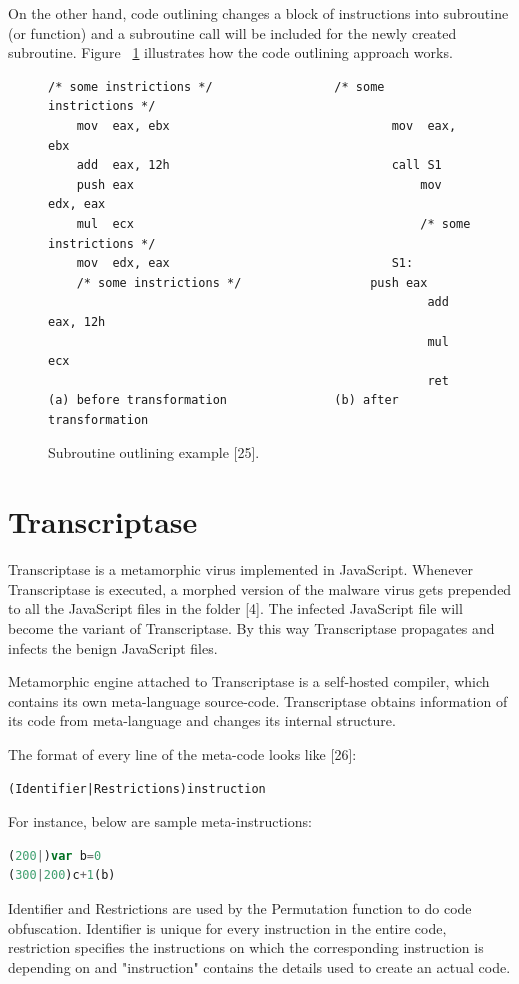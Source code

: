 On the other hand, code outlining changes a block of instructions into subroutine (or function) and a subroutine call will be included for the newly created subroutine. Figure ~\ref{fig:subroutineoutline} illustrates how the code outlining approach works.
\begin{figure}
  \centering
  \begin{lstlisting}[language=myasm]
	/* some instrictions */					/* some instrictions */
	mov  eax, ebx								mov  eax, ebx
	add  eax, 12h								call S1
	push eax										mov  edx, eax
	mul  ecx										/* some instrictions */
	mov  edx, eax								S1: 
	/* some instrictions */ 				 push eax
										 	 	 	 add  eax, 12h
										 	 	 	 mul  ecx
										 	 	 	 ret
(a) before transformation				(b) after transformation
\end{lstlisting}


    \caption[Subroutine outlining example]{Subroutine outlining example [25].}
    \label{fig:subroutineoutline}
\end{figure}

\section{Transcriptase}

Transcriptase is a metamorphic virus implemented in JavaScript. Whenever Transcriptase is executed, a morphed version of the malware virus gets prepended to all the JavaScript files in the folder [4]. The infected JavaScript file will become the variant of Transcriptase. By this way Transcriptase propagates and infects the benign JavaScript files.
  
Metamorphic engine attached to Transcriptase is a self-hosted compiler, which contains its own meta-language source-code. Transcriptase obtains information of its code from meta-language and changes its internal structure. 

The format of every line of the meta-code looks like [26]:

\begin{lstlisting}[frame=none,numbers=none]
(Identifier|Restrictions)instruction
\end{lstlisting}
For instance, below are sample meta-instructions:

\begin{lstlisting}[frame=none,numbers=none,language=JavaScript]
(200|)var b=0
(300|200)c+1(b)
\end{lstlisting}

Identifier and Restrictions are used by the Permutation function to do code obfuscation. Identifier is unique for every instruction in the entire code, restriction specifies the instructions on which the corresponding instruction is depending on and "instruction" contains the details used to create an actual code. 

